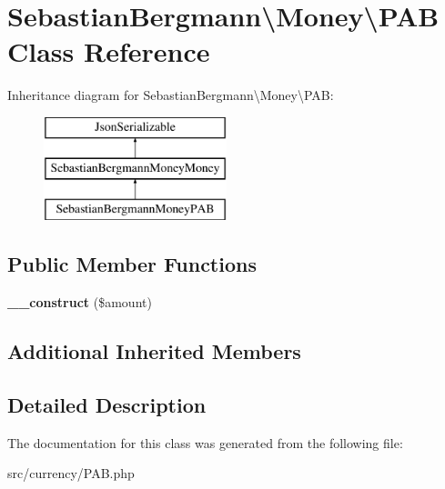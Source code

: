 \hypertarget{classSebastianBergmann_1_1Money_1_1PAB}{}\section{Sebastian\+Bergmann\textbackslash{}Money\textbackslash{}P\+A\+B Class Reference}
\label{classSebastianBergmann_1_1Money_1_1PAB}
Inheritance diagram for Sebastian\+Bergmann\textbackslash{}Money\textbackslash{}P\+A\+B\+:\begin{figure}[H]
\begin{center}
\leavevmode
\includegraphics[height=3.000000cm]{classSebastianBergmann_1_1Money_1_1PAB}
\end{center}
\end{figure}
\subsection*{Public Member Functions}
\begin{DoxyCompactItemize}
\item 
\hypertarget{classSebastianBergmann_1_1Money_1_1PAB_a40d91f8d6bbbe1bc0956a88446395b3c}{}{\bfseries \+\_\+\+\_\+construct} (\$amount)\label{classSebastianBergmann_1_1Money_1_1PAB_a40d91f8d6bbbe1bc0956a88446395b3c}

\end{DoxyCompactItemize}
\subsection*{Additional Inherited Members}


\subsection{Detailed Description}


The documentation for this class was generated from the following file\+:\begin{DoxyCompactItemize}
\item 
src/currency/P\+A\+B.\+php\end{DoxyCompactItemize}
